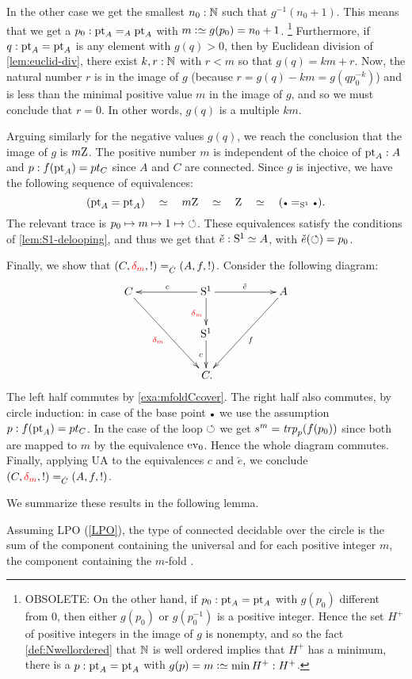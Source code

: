 In the other case we get the smallest $n_0: \mathbb{N}$ such that $g^{-1}(n_0 + 1)$.
This means that we get a $p_0:\mathrm{pt}_A=_A\mathrm{pt}_A$ with $m\defeq g(p_0)=n_0 +1$. 
\footnote{OBSOLETE: On the other hand, if $p_0:\mathrm{pt}_A=\mathrm{pt}_A$ with $g(p_0)$ different from $0$, then either $g(p_0)$ or $g(p_0^{-1})$ is a positive integer.  Hence the set $H^+$ of positive integers in the image of $g$ is nonempty, and so the fact \cref{def:Nwellordered} that $\mathbb{N}$ is well ordered implies that $H^+$ has a minimum, \ie there is a $p:\mathrm{pt}_A=\mathrm{pt}_A$ with  $g(p)=m\defequi\min H^+:H^+$.}
Furthermore, if $q:\mathrm{pt}_A=\mathrm{pt}_A$ is any element with $g(q)>0$, then  by Euclidean division of \cref{lem:euclid-div}, there exist $k,r:\mathbb{N}$ with $r<m$ so that $g(q)=km+r$.  Now, the natural number $r$ is in the image of $g$ (because $r=g(q)-km=g(qp_0^{-k})$) and is less than the minimal positive value $m$ in the image of $g$, and so we must conclude that $r=0$. In other words, $g(q)$ is a multiple $km$.

Arguing similarly for the negative values $g(q)$, we reach the conclusion that the image of $g$ is $m\mathrm{Z}$.
The positive number $m$ is independent of the choice of $\mathrm{pt}_A :A$ and $p: f(\mathrm{pt}_A)=pt_C$ since
$A$ and $C$ are connected. Since $g$ is injective, we have the following
sequence of equivalences:
\[
(\pt_A=\pt_A)\quad \equiv \quad m\zet \quad\equiv\quad \zet\quad \equiv\quad (\base=_{\Sc}\base).
\]
The relevant trace is $p_0 \mapsto m \mapsto 1 \mapsto {\circlearrowleft}$.
These equivalences satisfy the conditions of \cref{lem:S1-delooping},
and thus we get that $\check e: {\mathrm{S}^1}\simeq A$, with $\check e(\circlearrowleft) = p_0$.

Finally, we show that $(C,\dg{m},!) =_{\hat C} (A,f,!)$.
Consider the following diagram:
\[
\xymatrix{
C\ar[ddrr]_{\dg{m}} && 
\ar[d]_{\dg{m}}\ar[ll]_c\Sc\ar[rr]^{\check e} &&
A\ar[ddll]^{f}\\
&&\Sc\ar[d]_c\\
&&\,C.&}
\]
The left half commutes by \cref{exa:mfoldCcover}.
The right half also commutes, by circle induction:
in case of the base point $\base$ we use the assumption $p: f(\mathrm{pt}_A)=pt_C$.
In the case of the loop $\circlearrowleft$ we get $s^m = \trp{p}(f(p_0))$ since both
are mapped to $m$ by the equivalence $\ev_0$. Hence the whole diagram
commutes. Finally, applying UA to the equivalences $c$ and $\check e$,
we conclude $(C,\dg{m},!) =_{\hat C} (A,f,!)$.

We summarize these results in the following lemma.

\begin{lemma}
  \label{lem:componentsofcoversofS1}
Assuming LPO (\cref{LPO}), the type of connected decidable \coverings over the circle is the sum
of the component containing the universal \covering and for each positive integer $m$, 
the component containing the $m$-fold \covering.
\end{lemma}

